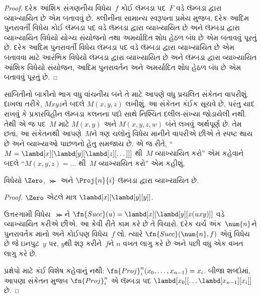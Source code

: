 \begin{proof}
દરેક આંશિક સંગણનીય વિધેય~$f$ કોઈ લૅમ્બડા પદ~$F$ વડે
લૅમ્બડા દ્વારા વ્યાખ્યાયિત છે એમ બતાવવું છે. ક્લીનીના સામાન્ય સ્વરૂપના
પ્રમેય મુજબ, દરેક આદિમ પુનરાવર્તી વિધેય કોઈ લૅમ્બડા પદ વડે
લૅમ્બડા દ્વારા વ્યાખ્યાયિત છે અને લૅમ્બડા દ્વારા વ્યાખ્યાયિત વિધેયો યોગ્ય
સંયોજનો તથા અમર્યાદિત શોધ હેઠળ બંધ છે એમ બતાવવું પૂરતું છે.
દરેક આદિમ પુનરાવર્તી વિધેય લૅમ્બડા પદ વડે લૅમ્બડા દ્વારા વ્યાખ્યાયિત
છે એમ બતાવવા માટે આરંભિક વિધેયો લૅમ્બડા દ્વારા વ્યાખ્યાયિત છે અને
લૅમ્બડા દ્વારા વ્યાખ્યાયિત આંશિક વિધેયો સંયોજન, આદિમ પુનરાવર્તન
અને અમર્યાદિત શોધ હેઠળ બંધ છે એમ બતાવવું પૂરતું છે.
\end{proof}

સાબિતીનો બાકીનો ભાગ વધુ વાંચનીય બને તે માટે આપણે વધુ પ્રચલિત
સંકેતન વાપરીશું. દાખલા તરીકે, $Mxyz$ને બદલે $M(x, y, z)$ લખીશું.
આ સંકેતન કંઈક સૂચવે છે, પરંતુ યાદ રાખવું કે પ્રકારવિહીન લૅમ્બડા
કલનના પદો સાથે નિશ્ચિત દલીલ-સંખ્યા જોડાયેલી નથી. તેથી એ જ
પદ~$M$ માટે $M(x,y)$ અને $M(x,y,z,w)$ બંને લખવું અર્થપૂર્ણ છે.
તેમ છતાં, આ સંકેતનથી આપણે~$M$ને ત્રણ ચલોનું વિધેય માનીને
વાપરીએ છીએ તે સ્પષ્ટ થાય છે અને વ્યાખ્યાઓ પાછળનો હેતુ સમજાય છે.
એ જ રીતે, ``$M = \lambd[x][\lambd[y][\lambd[z][\dots]]]$
થી~$M$ વ્યાખ્યાયિત કરો'' એમ કહેવાને બદલે ``$M(x,y,z) = \dots$
થી~$M$ વ્યાખ્યાયિત કરો'' એમ કહીશું.
\endgroup


\begingroup
\makeatletter{}\makeatother

\label{guunit:OLP-0351}


\begin{lem}
વિધેયો $\Zero$, $\Succ$ અને $\Proj{n}{i}$ લૅમ્બડા દ્વારા વ્યાખ્યાયિત છે.
\end{lem}

\begin{proof}
$\Zero$ એટલે માત્ર $\lambd[x][\lambd[y][y]]$.

ઉત્તરગામી વિધેય~$\Succ$ને
$\fn{Succ}(u) = \lambd[x][\lambd[y][x(uxy)]]$ વડે વ્યાખ્યાયિત
કરીએ છીએ. આ કેવી રીતે કામ કરે છે તે વિચારો. દરેક ચર્ચ અંક~$\num{n}$ને
પુનરાવર્તક માનો અને કોઈપણ વિધેય~$f$ લો. ત્યારે
$\fn{Succ}(\num{n},f)$ એવું વિધેય છે જે ઇનપુટ~$y$ પર, $y$થી
શરૂ કરીને~$f$ને $n$ વખત લાગુ કરે છે અને પછી વધુ એક વખત લાગુ કરે છે.

પ્રક્ષેપો માટે કંઈ વિશેષ કહેવાનું નથી:
$\fn{Proj}^n_i(x_0, \dots, x_{n-1}) = x_i$. બીજા શબ્દોમાં,
આપણા સંકેતન મુજબ $\fn{Proj}^n_i$ એ લૅમ્બડા પદ
$\lambd[x_0][\dots \lambd[x_{n-1}][x_i]]$ છે.
\end{proof}
\endgroup


